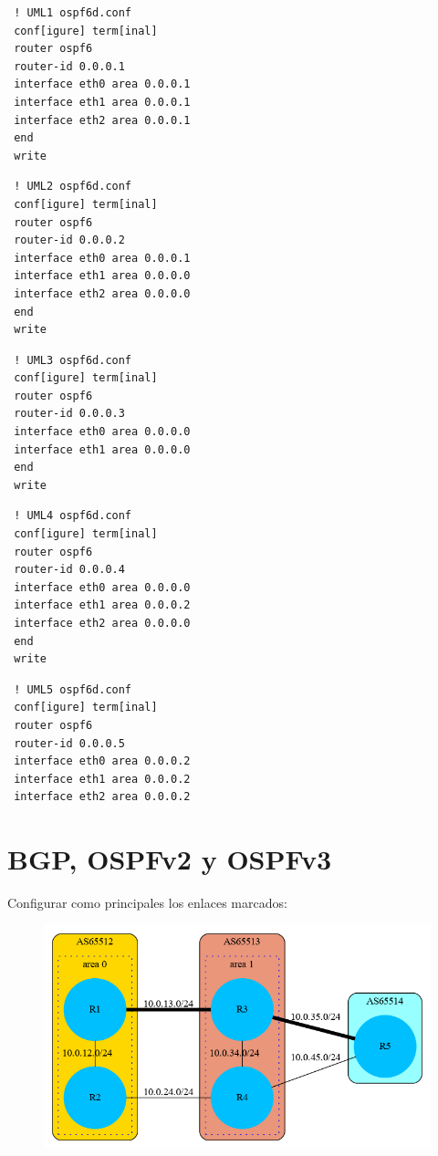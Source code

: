 \documentclass{article}
\begin{document}
\begin{verbatim}
 ! UML1 ospf6d.conf
 conf[igure] term[inal]
 router ospf6
 router-id 0.0.0.1
 interface eth0 area 0.0.0.1
 interface eth1 area 0.0.0.1
 interface eth2 area 0.0.0.1
 end
 write
\end{verbatim}

\begin{verbatim}
 ! UML2 ospf6d.conf
 conf[igure] term[inal]
 router ospf6
 router-id 0.0.0.2
 interface eth0 area 0.0.0.1
 interface eth1 area 0.0.0.0
 interface eth2 area 0.0.0.0
 end
 write
\end{verbatim}

\begin{verbatim}
 ! UML3 ospf6d.conf
 conf[igure] term[inal]
 router ospf6
 router-id 0.0.0.3
 interface eth0 area 0.0.0.0
 interface eth1 area 0.0.0.0
 end
 write
\end{verbatim}

\begin{verbatim}
 ! UML4 ospf6d.conf
 conf[igure] term[inal]
 router ospf6
 router-id 0.0.0.4
 interface eth0 area 0.0.0.0
 interface eth1 area 0.0.0.2
 interface eth2 area 0.0.0.0
 end
 write
\end{verbatim}

\begin{verbatim}
 ! UML5 ospf6d.conf
 conf[igure] term[inal]
 router ospf6
 router-id 0.0.0.5
 interface eth0 area 0.0.0.2
 interface eth1 area 0.0.0.2
 interface eth2 area 0.0.0.2
\end{verbatim}

\section{BGP, OSPFv2 y OSPFv3}
  Configurar como principales los enlaces marcados:
  \begin{figure}[h]
    \includegraphics[width=12cm]{bgp_next_hop.png}
  \end{figure}
  
\end{document}

